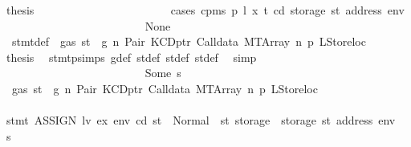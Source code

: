 \begin{isabellebody}
\ {\isacharquery}{\kern0pt}thesis\isanewline
\ \ \ \ \ \ \ \ \ \ \ \ \ \ \ \ \ \ \ \ \ \ \isamarkupfalse%
\ {\isacharparenleft}{\kern0pt}cases\ {\isachardoublequoteopen}cpm{}s\ p\ l\ x\ t\ cd\ {\isacharparenleft}{\kern0pt}storage\ st{\isacharprime}{\kern0pt}{\isacharprime}{\kern0pt}\ {\isacharparenleft}{\kern0pt}address\ env{\isacharparenright}{\kern0pt}{\isacharparenright}{\kern0pt}{\isachardoublequoteclose}{\isacharparenright}{\kern0pt}\isanewline
\ \ \ \ \ \ \ \ \ \ \ \ \ \ \ \ \ \ \ \ \ \ \ \ \isamarkupfalse%
\ None\isanewline
\ \ \ \ \ \ \ \ \ \ \ \ \ \ \ \ \ \ \ \ \ \ \ \ \isamarkupfalse%
\ {}{\isacharparenleft}{\kern0pt}{}{\isacharparenright}{\kern0pt}\ stmt{\isacharunderscore}{\kern0pt}def\ {\isacharbackquoteopen}{\isasymnot}\ gas\ st\ {\isasymle}\ g{\isacharbackquoteclose}\ n\ Pair\ KCDptr\ Calldata\ MTArray\ n{}\ p{}\ LStoreloc\ \isamarkupfalse%
\ {\isacharquery}{\kern0pt}thesis\ \isamarkupfalse%
\ stmt{\isachardot}{\kern0pt}psimps{\isacharparenleft}{\kern0pt}{}{\isacharparenright}{\kern0pt}\ g{\isacharunderscore}{\kern0pt}def\ st{\isacharprime}{\kern0pt}{\isacharunderscore}{\kern0pt}def\ st{\isacharprime}{\kern0pt}{\isacharprime}{\kern0pt}{\isacharunderscore}{\kern0pt}def\ st{\isacharprime}{\kern0pt}{\isacharprime}{\kern0pt}{\isacharprime}{\kern0pt}{\isacharunderscore}{\kern0pt}def\ \isamarkupfalse%
\ simp\isanewline
\ \ \ \ \ \ \ \ \ \ \ \ \ \ \ \ \ \ \ \ \ \ \isamarkupfalse%
\isanewline
\ \ \ \ \ \ \ \ \ \ \ \ \ \ \ \ \ \ \ \ \ \ \ \ \isamarkupfalse%
\ {\isacharparenleft}{\kern0pt}Some\ s{\isacharparenright}{\kern0pt}\isanewline
\ \ \ \ \ \ \ \ \ \ \ \ \ \ \ \ \ \ \ \ \ \ \ \ \isamarkupfalse%
\ {\isacharbackquoteopen}{\isasymnot}\ gas\ st\ {\isasymle}\ g{\isacharbackquoteclose}\ n\ Pair\ KCDptr\ Calldata\ MTArray\ n{}\ p{}\ LStoreloc\isanewline
\ \ \ \ \ \ \ \ \ \ \ \ \ \ \ \ \ \ \ \ \ \ \ \ \isamarkupfalse%
\ {\isachardoublequoteopen}stmt\ {\isacharparenleft}{\kern0pt}ASSIGN\ lv\ ex{\isacharparenright}{\kern0pt}\ env\ cd\ st\ {\isacharequal}{\kern0pt}\ Normal\ {\isacharparenleft}{\kern0pt}{\isacharparenleft}{\kern0pt}{\isacharparenright}{\kern0pt}{\isacharcomma}{\kern0pt}\ st{\isacharprime}{\kern0pt}{\isacharprime}{\kern0pt}{\isacharprime}{\kern0pt}\ {\isasymlparr}storage\ {\isacharcolon}{\kern0pt}{\isacharequal}{\kern0pt}\ {\isacharparenleft}{\kern0pt}storage\ st{\isacharprime}{\kern0pt}{\isacharprime}{\kern0pt}{\isacharparenright}{\kern0pt}\ {\isacharparenleft}{\kern0pt}address\ env\ {\isacharcolon}{\kern0pt}{\isacharequal}{\kern0pt}\ s{\isacharparenright}{\kern0pt}{\isasymrparr}{\isacharparenright}{\kern0pt}{\isachardoublequoteclose}\isanewline

\end{isabellebody}
